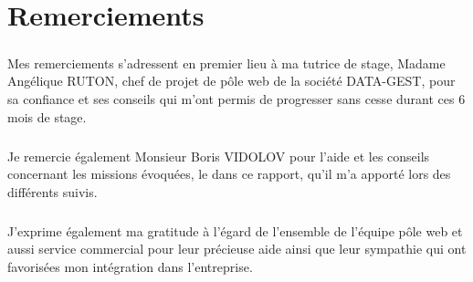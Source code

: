 \chapter{Remerciements}
\setlength{\parskip}{0.5\baselineskip}




\paragraph{}
Mes remerciements s’adressent en premier lieu à ma tutrice de stage,  Madame Angélique RUTON, chef de projet de pôle web de la société DATA-GEST, pour sa confiance et ses conseils qui m’ont permis de progresser sans cesse durant ces 6 mois de stage.

\paragraph{} 
Je remercie également Monsieur Boris VIDOLOV pour l’aide et les conseils concernant les missions évoquées, le dans ce rapport, qu’il m’a apporté lors des différents suivis.

\paragraph{} 
J’exprime également ma gratitude à l’égard de l’ensemble de l'équipe pôle web et aussi service commercial pour leur précieuse aide ainsi que leur sympathie qui ont favorisées mon intégration dans l’entreprise.
